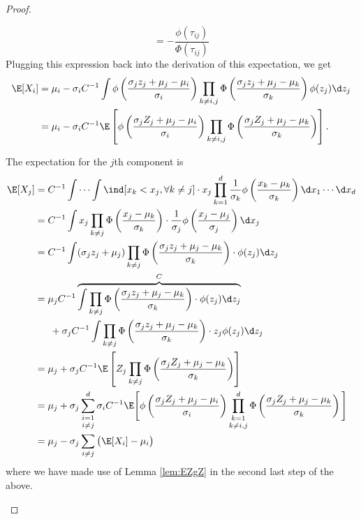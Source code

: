 \documentclass[]{article}
\begin{document}
\begin{proof}
\begin{enumerate}[label=(\roman*)]
\[    = - \frac{\phi(\tau_{ij})}{\Phi(\tau_{ij})}
  \] Plugging this expression back into the derivation of this expectation, we get
  \begin{align*}
  \E[X_i] 
  &= \mu_i -  \sigma_i C^{-1} \int 
  \phi \left( \frac{\sigma_j z_j + \mu_j - \mu_i}{\sigma_i} \right)
  \prod_{k \neq i,j} \Phi \left( \frac{\sigma_j z_j + \mu_j - \mu_k}{\sigma_k} \right) \phi (z_j) \d z_j \\
  &= \mu_i - \sigma_i C^{-1} \E \left[ \phi \left( \frac{\sigma_j Z_j + \mu_j - \mu_i}{\sigma_i} \right)
  \prod_{k \neq i,j} \Phi \left( \frac{\sigma_j Z_j + \mu_j - \mu_k}{\sigma_k} \right) \right].
  \end{align*}
  
  The expectation for the $j$th component is
  \begin{align*}
    \E[X_j] 
    &= C^{-1} \idotsint \ind[x_k < x_j, \forall k \neq j] \cdot x_j  \prod_{k=1}^d \frac{1}{\sigma_k}\phi \left( \frac{x_k - \mu_k}{\sigma_k} \right) \d x_1 \cdots \d x_d \\
    &= C^{-1} \int x_j  \prod_{k \neq j} \Phi \left( \frac{x_j - \mu_k}{\sigma_k} \right) 
    \cdot \frac{1}{\sigma_j} \phi \left( \frac{x_j - \mu_j}{\sigma_j} \right) \d x_j  \\    
    &= C^{-1} \int (\sigma_j z_j + \mu_j)  \prod_{k \neq j} \Phi \left( \frac{\sigma_j z_j + \mu_j - \mu_k}{\sigma_k} \right) \cdot \phi (z_j) \d z_j  \\   
    &= \mu_j C^{-1} 
    \overbrace{
    \int  \prod_{k \neq j} \Phi \left( \frac{\sigma_j z_j + \mu_j - \mu_k}{\sigma_k} \right) \cdot \phi (z_j) \d z_j
    }^{C}  \\   
    &\phantom{==} + \sigma_j C^{-1} \int  \prod_{k \neq j} \Phi \left( \frac{\sigma_j z_j + \mu_j - \mu_k}{\sigma_k} \right) \cdot z_j \phi (z_j) \d z_j \\
    &= \mu_j + \sigma_j C^{-1} \E \left[ Z_j \prod_{k \neq j} \Phi \left( \frac{\sigma_j Z_j + \mu_j - \mu_k}{\sigma_k} \right) \right] \\
    &= \mu_j + \sigma_j  \mathop{\sum_{i=1}^d}_{i \neq j} \sigma_i C^{-1} \E \Bigg[ \phi \left( \frac{\sigma_j Z_j + \mu_j - \mu_i}{\sigma_i} \right) \mathop{\prod_{k=1}^d}_{k \neq i,j} \Phi \left( \frac{\sigma_j Z_j + \mu_j - \mu_k}{\sigma_k} \right) \Bigg] \\
    &= \mu_j - \sigma_j \sum_{i \neq j} \big(\E[X_i] - \mu_i \big)
  \end{align*}
  where we have made use of Lemma \ref{lem:EZgZ} in the second last step of the above.


\end{enumerate}
\end{proof}
\end{document}
